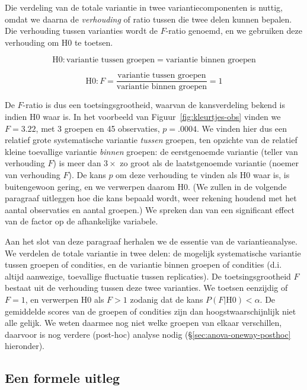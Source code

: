 \documentclass[
]{book}
\begin{document}
Die verdeling van de totale variantie in twee variantiecomponenten is
nuttig, omdat we daarna de \emph{verhouding} of ratio tussen die twee delen
kunnen bepalen. Die verhouding tussen varianties wordt de \(F\)-ratio
genoemd, en we gebruiken deze verhouding om H0 te toetsen.

\[\textrm{H0}: \textrm{variantie tussen groepen} = \textrm{variantie binnen groepen}\]

\[\textrm{H0}: F = \frac{\textrm{variantie tussen groepen}}{\textrm{variantie binnen groepen}} = 1\]

De \(F\)-ratio is dus een toetsingsgrootheid, waarvan de kansverdeling
bekend is indien H0 waar is. In het voorbeeld van
Figuur~\ref{fig:kleurtjes-obs} vinden we \(F=3.22\), met 3 groepen en 45
observaties, \(p=.0004\). We vinden hier dus een relatief grote
systematische variantie \emph{tussen} groepen, ten opzichte van de relatief
kleine toevallige variantie \emph{binnen} groepen: de eerstgenoemde variantie
(teller van verhouding \(F\)) is meer dan \(3\times\) zo groot als de
laatstgenoemde variantie (noemer van verhouding \(F\)). De kans \(p\) om
deze verhouding te vinden als H0 waar is, is buitengewoon gering, en we
verwerpen daarom H0. (We zullen in de volgende paragraaf uitleggen hoe
die kans bepaald wordt, weer rekening houdend met het aantal observaties
en aantal groepen.) We spreken dan van een significant effect van de
factor op de afhankelijke variabele.

Aan het slot van deze paragraaf herhalen we de essentie van de
variantieanalyse. We verdelen de totale variantie in twee delen: de
mogelijk systematische variantie tussen groepen of condities, en de
variantie binnen groepen of condities (d.i. altijd aanwezige, toevallige
fluctuatie tussen replicaties). De toetsingsgrootheid \(F\) bestaat uit de
verhouding tussen deze twee varianties. We toetsen eenzijdig of \(F=1\),
en verwerpen H0 als \(F>1\) zodanig dat de kans
\(P(F|\textrm{H0}) < \alpha\). De gemiddelde scores van de groepen of
condities zijn dan hoogstwaarschijnlijk niet alle gelijk. We weten
daarmee nog niet welke groepen van elkaar verschillen, daarvoor is nog
verdere (post-hoc) analyse nodig
(§\ref{sec:anova-oneway-posthoc} hieronder).

\hypertarget{sec:anova-oneway-formeel}{%
\subsection{Een formele uitleg}\label{sec:anova-oneway-formeel}}
\end{document}
